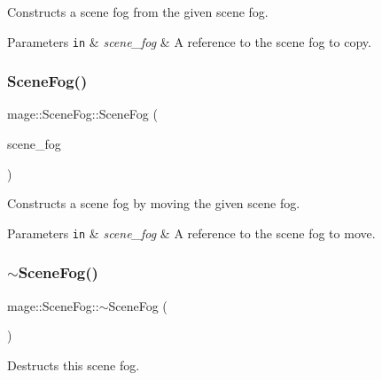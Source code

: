 Constructs a scene fog from the given scene fog.


\begin{DoxyParams}[1]{Parameters}
\mbox{\tt in}  & {\em scene\+\_\+fog} & A reference to the scene fog to copy. \\
\hline
\end{DoxyParams}
\hypertarget{structmage_1_1_scene_fog_a6080ed91eb76b5872646ca8d778a2856}{}\label{structmage_1_1_scene_fog_a6080ed91eb76b5872646ca8d778a2856} 
\subsubsection{\texorpdfstring{Scene\+Fog()}{SceneFog()}\hspace{0.1cm}{\footnotesize\ttfamily [3/3]}}
{\footnotesize\ttfamily mage\+::\+Scene\+Fog\+::\+Scene\+Fog (\begin{DoxyParamCaption}\item[{\hyperlink{structmage_1_1_scene_fog}{Scene\+Fog} \&\&}]{scene\+\_\+fog }\end{DoxyParamCaption})\hspace{0.3cm}{\ttfamily [default]}}

Constructs a scene fog by moving the given scene fog.


\begin{DoxyParams}[1]{Parameters}
\mbox{\tt in}  & {\em scene\+\_\+fog} & A reference to the scene fog to move. \\
\hline
\end{DoxyParams}
\hypertarget{structmage_1_1_scene_fog_afb25181d31f74e4981c226019fee0669}{}\label{structmage_1_1_scene_fog_afb25181d31f74e4981c226019fee0669} 
\subsubsection{\texorpdfstring{$\sim$\+Scene\+Fog()}{~SceneFog()}}
{\footnotesize\ttfamily mage\+::\+Scene\+Fog\+::$\sim$\+Scene\+Fog (\begin{DoxyParamCaption}{ }\end{DoxyParamCaption})\hspace{0.3cm}{\ttfamily [default]}}

Destructs this scene fog. 

